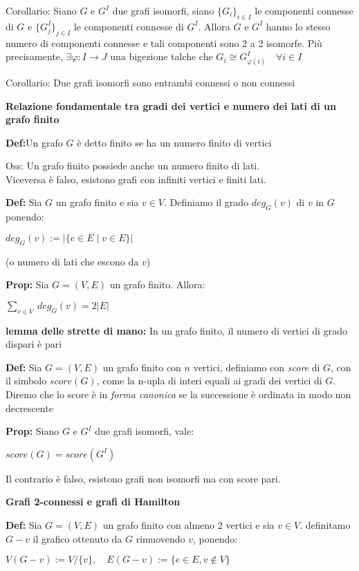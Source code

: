 \documentclass[12pt, a4paper]{article}
\begin{document}
Corollario: Siano $G$ e $G^{I}$ due grafi isomorfi, siano $\{G_{i}\}_{i\in I}$ le componenti connesse di $G$ e 
$\{G^{I}_{j}\}_{j\in I}$ le componenti connesse di $G^{I}$. Allora $G$ e $G^{I}$ hanno lo stesso numero di componenti
connesse e tali componenti sono 2 a 2 isomorfe. Più precisamente, $\exists\varphi:I\to J$ una bigezione talche che 
$G_{i}\cong G^{I}_{\varphi(i)}\quad\forall i\in I$

Corollario: Due grafi isomorfi sono entrambi connessi o non connessi

\newpage
\textbf{Relazione fondamentale tra gradi dei vertici e numero dei lati di un grafo finito}

\textbf{Def:}Un grafo $G$ è detto finito se ha un numero finito di vertici

Oss: Un grafo finito possiede anche un numero finito di lati.\\Viceversa è falso, esistono grafi con infiniti vertici
e finiti lati.

\textbf{Def:} Sia $G$ un grafo finito e sia $v\in V$. Definiamo il grado $deg_{G}(v)$ di $v$ in $G$ ponendo:
\begin{center}
    $deg_{G}(v):=|\{e\in E\mid v\in E\}|$

    \small{(o numero di lati che escono da $v$)}
\end{center}

\textbf{Prop:} Sia $G=(V,E)$ un grafo finito. Allora:
\begin{center}
    $\sum_{v\in V}\ deg_{G}(v)=2|E|$
\end{center}

\textbf{lemma delle strette di mano:} In un grafo finito, il numero di vertici di grado dispari è pari

\textbf{Def:} Sia $G=(V,E)$ un grafo finito con $n$ vertici, definiamo con \textit{score} di $G$, con il simbolo
$score(G)$, come la n-upla di interi equali ai gradi dei vertici di $G$.\\ Diremo che lo score è in \textit{forma
canonica} se la successione è ordinata in modo non decrescente

\textbf{Prop:} Siano $G$ e $G^{I}$ due grafi isomorfi, vale:
\begin{center}
    $score(G)=score(G^{I})$
\end{center}
Il contrario è falso, esistono grafi non isomorfi ma con score pari.

\textbf{Grafi 2-connessi e grafi di Hamilton}

\textbf{Def:} Sia $G=(V,E)$ un grafo finito con almeno 2 vertici e sia $v\in V$. definitamo $G-v$ il grafico
ottenuto da $G$ rimuovendo $v$, ponendo:
\begin{center}
    $V(G-v):=V/\{v\},\quad E(G-v):=\{e\in E, v\notin V\}$
\end{center}
\end{document}
